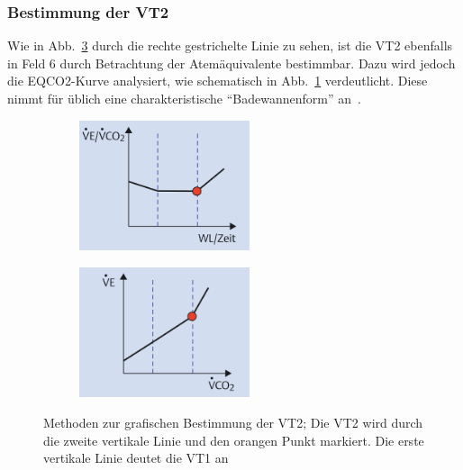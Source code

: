 \subsubsection{Bestimmung der VT2}
%
Wie in Abb.~\ref{pic:pic5} durch die rechte gestrichelte Linie zu sehen, ist die VT2 ebenfalls in Feld 6 durch Betrachtung der Atemäquivalente bestimmbar. Dazu wird jedoch die \gls{EQCO2}-Kurve analysiert, wie schematisch in Abb.~\ref{subpic:pic7} verdeutlicht. Diese nimmt für üblich eine charakteristische "`Badewannenform"' an~\cite{Kroidl.2015}.
%
\begin{figure}[H]
	\centering
	\begin{subfigure}[t]{0.45\textwidth}
		\centering
		\includegraphics[width=50mm]{Bilder/eqco2.png}
		\label{subpic:pic7}
	\end{subfigure}%
	\hfil
	\begin{subfigure}[t]{0.45\textwidth}
		\centering
		\includegraphics[width=50mm]{Bilder/field4.png}
		\label{subpic:pic8}
	\end{subfigure}
	\caption[Methoden zur grafischen Bestimmung der VT2]{Methoden zur grafischen Bestimmung der VT2; Die VT2 wird durch die zweite vertikale Linie und den orangen Punkt markiert. Die erste vertikale Linie deutet die VT1 an~\cite{Kroidl.2015}}
	\label{pic:pic5}
\end{figure}
